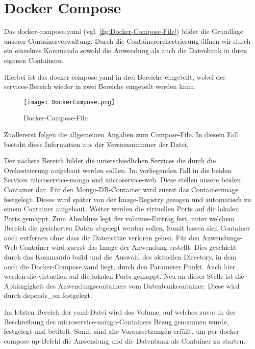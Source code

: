 
\chapter{Docker Compose}
\label{ch:Docker Compose}
Das docker-compose.yaml (vgl. \autoref{fig:Docker-Compose-File}) bildet die Grundlage unserer Containerverwaltung. Durch die Containerorchestrierung öffnen wir durch ein einzelnes Kommando sowohl die Anwendung als auch die Datenbank in ihren eigenen Containern.

Hierbei ist das \glqq docker-compose.yaml\grqq{} in drei Bereiche eingeteilt, wobei der services-Bereich wieder in zwei Bereiche eingeteilt werden kann.

\begin{wrapfigure}{r}{0\textwidth}
\centering
\texttt{[image: DockerCompose.png]}
\vspace{3pt}
\caption{Docker-Compose-File}
\label{fig:Docker-Compose-File}
\end{wrapfigure}


Zuallererst folgen die allgemeinen Angaben zum Compose-File. In diesem Fall besteht diese Information aus der Versionsnummer der Datei.

Der nächste Bereich bildet die unterschiedlichen Services die durch die Orchestrierung aufgebaut werden solllen. Im vorliegenden Fall in die beiden Services \glqq  microservice-mongo\grqq{} und \glqq  microservice-web\grqq{}. Diese stellen unsere beiden Container dar. 
Für den Mongo-DB-Container wird zuerst das Containerimage festgelegt. Dieses wird später von der Image-Registry gezogen und automatisch zu einem Container aufgebaut. Weiter werden die virtuellen Ports auf die lokalen Ports gemappt. Zum Abschluss legt der \glqq  volumes\grqq{}-Eintrag fest, unter welchem Bereich die gesicherten Daten abgelegt werden sollen. Somit lassen sich Container auch entfernen ohne dass die Datensätze verloren gehen.
Für den Anwendungs-Web-Container wird zuerst das Image der Anwendung erstellt. Dies geschieht durch das Kommando \glqq  build\grqq{} und die Auswahl des aktuellen Directory, in dem auch die Docker-Compose.yaml liegt, durch den Parameter \glqq  Punkt\grqq{}. Auch hier werden die virtuellen auf die lokalen Ports gemappt. Neu an dieser Stelle ist die Abhängigkeit des Anwendungscontainers vom Datenbankcontainer. Diese wird durch \glqq  depends\_on\grqq{} festgelegt.

Im letzten Bereich der yaml-Datei wird das Volume, auf welches zuvor in der Beschreibung des \glqq  microservice-mongo\grqq{}-Containers Bezug genommen wurde, festgelegt und betitelt.
Somit sind alle Voraussetzungen erfüllt, um per \glqq  docker-compose up\grqq -Befehl die Anwendung und die Datenbank als Container zu starten.
